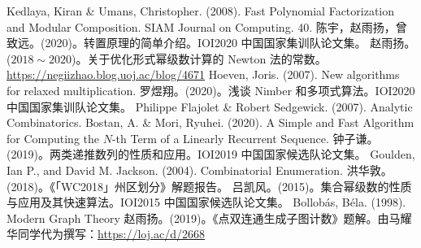 \begin{thebibliography}{99}
\ifcont
{}
\fi
{} Kedlaya, Kiran \& Umans, Christopher. (2008). Fast Polynomial Factorization and Modular Composition. SIAM Journal on Computing. 40. 
 陈宇，赵雨扬，曾致远。(2020)。转置原理的简单介绍。IOI2020 中国国家集训队论文集。
 赵雨扬。($2018\sim 2020$)。关于优化形式幂级数计算的 Newton 法的常数。\url{https://negiizhao.blog.uoj.ac/blog/4671}
 Hoeven, Joris. (2007). New algorithms for relaxed multiplication.  
 罗煜翔。(2020)。浅谈 Nimber 和多项式算法。IOI2020 中国国家集训队论文集。
 Philippe Flajolet \& Robert Sedgewick. (2007). Analytic Combinatorics.
 Bostan, A. \& Mori, Ryuhei. (2020). A Simple and Fast Algorithm for Computing the $N$-th Term of a Linearly Recurrent Sequence. 
 钟子谦。(2019)。两类递推数列的性质和应用。IOI2019 中国国家候选队论文集。
 Goulden, Ian P., and David M. Jackson. (2004). Combinatorial Enumeration.
 洪华敦。(2018)。《「WC2018」州区划分》解题报告。
 吕凯风。(2015)。集合幂级数的性质与应用及其快速算法。IOI2015 中国国家候选队论文集。
 Bollob\'as, B\'ela. (1998). Modern Graph Theory
 赵雨扬。(2019)。《点双连通生成子图计数》题解。由马耀华同学代为撰写：\url{https://loj.ac/d/2668}
\end{thebibliography}
